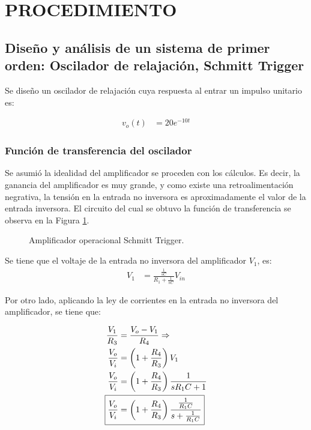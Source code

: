 \documentclass[journal]{IEEEtran}
\begin{document}

\section{PROCEDIMIENTO\\}

\subsection{Dise\~no y an\'alisis de un sistema de primer
orden: Oscilador de relajaci\'on, Schmitt Trigger}

Se dise\~no un oscilador de relajaci\'on cuya respuesta al
entrar un impulso unitario es: 

\begin{align}
	\label{res_time} v_{o}(t) & = 20 e^{- 10 t}  
\end{align}

\subsubsection*{Funci\'on de transferencia del oscilador}
Se asumi\'o la idealidad del amplificador se proceden con 
los c\'alculos. Es decir, la ganancia del amplificador es 
muy grande, y como existe una retroalimentación negrativa,
la tensión en la entrada no inversora es aproximadamente el
valor de la entrada inversora. El circuito del cual se obtuvo
la funci\'on de transferencia se observa en la Figura
\ref{oscilador}. 

\begin{figure}[h]
\caption{Amplificador operacional Schmitt Trigger.}
\label{oscilador}
\end{figure}

Se tiene que el voltaje de la entrada no inversora del amplificador $V_1$, es: 
\begin{align*}
	V_1 & = \frac{\frac{1}{s C}}{ R_1 + \frac{1}{s C}}
	 V_{in} 
\end{align*}

Por otro lado, aplicando la ley de corrientes en la entrada no inversora del amplificador, se tiene que: 

\begin{align*}
	\frac{V_1}{R_3} & = \frac{V_o -V_1}{R_4} \Rightarrow \\ 
	\frac{V_o}{V_i} & = \left( 1 + \frac{R_4}{R_3} \right)
	 V_{1} \\
	\frac{V_o}{V_i} & = \left
	( 1 + \frac{R_4}{R_3} \right)\frac{1}{ s R_1 C + 1} \\
	\Aboxed {\frac{V_o}{V_i} & = \left
	( 1 + \frac{R_4}{R_3} \right)
	\frac{\frac{1}{R_1 C}}{ s  + \frac{1}{R_1 C}}}
\end{align*}
\end{document}
